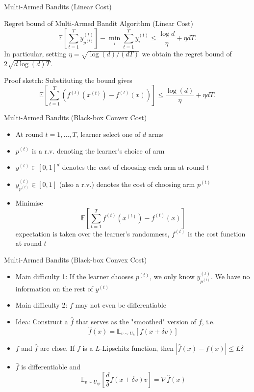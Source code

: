 \begin{frame}{Multi-Armed Bandits (Linear Cost)}
    \small
    \begin{block}{Regret bound of Multi-Armed Bandit Algorithm (Linear Cost)}
        $$
        \mathbb{E}\left[\sum_{t=1}^{T} y^{(t)}_{p^{(t)}}\right] - \min_i \sum_{t=1}^{T} y^{(t)}_i
        \leq \frac{\log d}{\eta} + \eta d T.
        $$
        In particular, setting $\eta = \sqrt{\log(d)/(dT)}$ we obtain the regret bound of
        $2\sqrt{d \log(d) T}$.
    \end{block}
    Proof sketch:
    Substituting the bound gives
    $$
    \mathbb{E}\left[ \sum_{t=1}^{T} \left( f^{(t)}(x^{(t)}) - f^{(t)}(x) \right) \right] \leq \frac{\log(d)}{\eta} + \eta d T.
    $$
\end{frame}

\begin{frame}{Multi-Armed Bandits (Black-box Convex Cost)}
    \begin{itemize}
        \item At round $t = 1, \dots, T$, learner select one of $d$ arms 
        \item $p^{(t)}$ is a r.v. denoting the learner's choice of arm 
        \item $y^{(t)} \in [0, 1]^d$ denotes the cost of choosing each arm at round $t$ \pause
        \item $y^{(t)}_{p^{(t)}} \in [0, 1]$ (also a r.v.) denotes the cost of choosing arm $p^{(t)}$ 
        \item Minimise $$ \mathbb{E}\left[\sum_{t=1}^T f^{(t)}(x^{(t)}) - f^{(t)}(x) \right] $$
        expectation is taken over the learner's randomness, $f^{(t)}$ is the cost function at round $t$
    \end{itemize}
\end{frame}

\begin{frame}{Multi-Armed Bandits (Black-box Convex Cost)}
    \begin{itemize}
        \item Main difficulty 1: If the learner chooses $p^{(t)}$, we only know $y^{(t)}_{p^{(t)}}$. We have no information on the rest of $y^{(t)}$ \pause
        \item Main difficulty 2: $f$ may not even be differentiable \pause
        \item Idea: Construct a $\hat{f}$ that serves as the "smoothed" version of $f$, i.e.
        $$ \hat{f}(x) = \mathbb{E}_{v \sim U_b} [f(x + \delta v)] $$ \pause
        \item $f$ and $\hat{f}$ are close. If $f$ is a $L$-Lipschitz function, then $|\hat{f}(x) - f(x)| \leq L \delta$ \pause
        \item $\hat{f}$ is differentiable and 
        $$\mathbb{E}_{v \sim U_{sp}}\left[ \frac{d}{\delta}f(x + \delta v)v \right] = \nabla \hat{f}(x)$$
    \end{itemize}
\end{frame}

